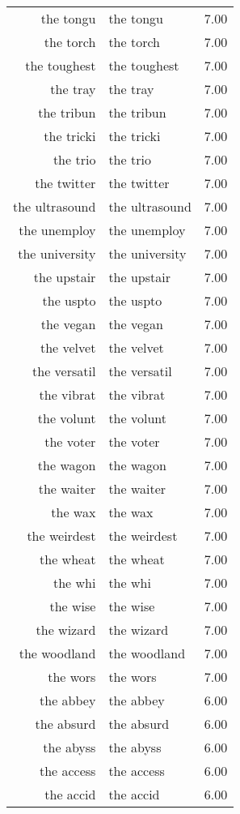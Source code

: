 \begin{table}[ht]
\begin{tabular}{rlr}
  the tongu & the tongu & 7.00 \\ 
  the torch & the torch & 7.00 \\ 
  the toughest & the toughest & 7.00 \\ 
  the tray & the tray & 7.00 \\ 
  the tribun & the tribun & 7.00 \\ 
  the tricki & the tricki & 7.00 \\ 
  the trio & the trio & 7.00 \\ 
  the twitter & the twitter & 7.00 \\ 
  the ultrasound & the ultrasound & 7.00 \\ 
  the unemploy & the unemploy & 7.00 \\ 
  the university & the university & 7.00 \\ 
  the upstair & the upstair & 7.00 \\ 
  the uspto & the uspto & 7.00 \\ 
  the vegan & the vegan & 7.00 \\ 
  the velvet & the velvet & 7.00 \\ 
  the versatil & the versatil & 7.00 \\ 
  the vibrat & the vibrat & 7.00 \\ 
  the volunt & the volunt & 7.00 \\ 
  the voter & the voter & 7.00 \\ 
  the wagon & the wagon & 7.00 \\ 
  the waiter & the waiter & 7.00 \\ 
  the wax & the wax & 7.00 \\ 
  the weirdest & the weirdest & 7.00 \\ 
  the wheat & the wheat & 7.00 \\ 
  the whi & the whi & 7.00 \\ 
  the wise & the wise & 7.00 \\ 
  the wizard & the wizard & 7.00 \\ 
  the woodland & the woodland & 7.00 \\ 
  the wors & the wors & 7.00 \\ 
  the abbey & the abbey & 6.00 \\ 
  the absurd & the absurd & 6.00 \\ 
  the abyss & the abyss & 6.00 \\ 
  the access & the access & 6.00 \\ 
  the accid & the accid & 6.00 \\ 

\end{tabular}
\end{table}
